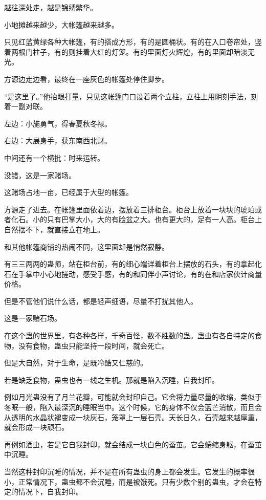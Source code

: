 
\begin{this_body}



越往深处走，越是锦绣繁华。

小地摊越来越少，大帐篷越来越多。

只见红蓝黄绿各种大帐篷，有的搭成方形，有的是圆桶状。有的在入口卷帘处，竖着两根门柱子，有的则挂着大红的灯笼。有的里面灯火辉煌，有的里面却暗淡无光。

方源边走边看，最终在一座灰色的帐篷处停住脚步。

“是这里了。”他抬眼打量，只见这帐篷门口设着两个立柱，立柱上用阴刻手法，刻着一副对联。

左边：小施勇气，得春夏秋冬禄。

右边：大展身手，获东南西北财。

中间还有一个横批：时来运转。

没错，这是一家赌场。

这赌场占地一亩，已经属于大型的帐篷。

方源走了进去。在帐篷里面依着边，摆放着三排柜台。柜台上放着一块块的琥珀或者化石。小的只有巴掌大小，大的有脸盆之大。也有更大的，足有一人高。柜台上自然摆不下，就直接立在地上。

和其他帐篷商铺的热闹不同，这里面却是悄然寂静。

有三三两两的蛊师，站在柜台前，有的细心端详着柜台上摆放的石头，有的拿起化石在手掌中小心地搓动，感受手感，有的和同伴小声讨论，有的在和店家伙计商量价格。

但是不管他们说什么话，都是轻声细语，尽量不打扰其他人。

这是一家赌石场。

在这个蛊的世界里，有各种各样，千奇百怪，数不胜数的蛊。蛊虫有各自特定的食物，没有食物，蛊虫只能坚持一段时间，就会死亡。

但是大自然，对于生命，是既冷酷又仁慈的。

若是缺乏食物，蛊虫也有一线之生机。那就是陷入沉睡，自我封印。

例如月光蛊没有了月兰花瓣，可能就会封印自己。它会将力量尽量的收缩，类似于冬眠一般，陷入最深沉的睡眠当中。这个时候，它的身体不仅会蓝芒消散，而且会从透明的水晶状褪变成一块灰石，笼罩上一层石壳。天长日久，石壳越来越厚重，就会形成一块顽石。

再例如酒虫，若是它自我封印，就会结成一块白色的蚕茧。它会蜷缩身躯，在蚕茧中沉睡。

当然这种封印沉睡的情况，并不是在所有蛊虫的身上都会发生。它发生的概率很小，正常情况下，蛊虫都不会沉睡，而是被饿死。只有少数个别的蛊虫，才会在特定的情况下，自我封印。


\end{this_body}
